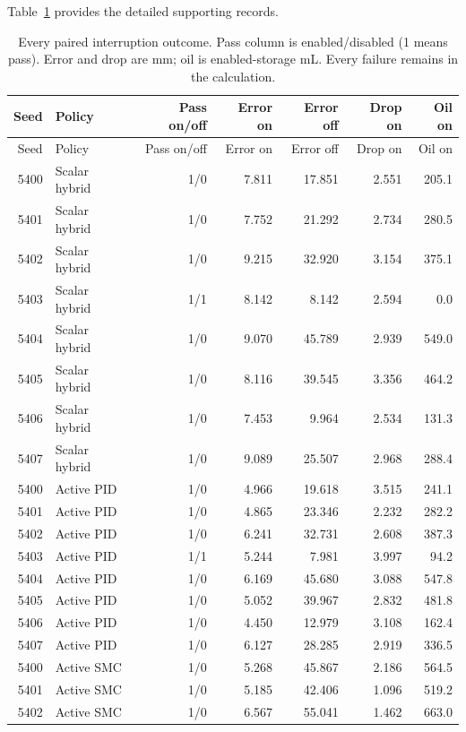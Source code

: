 \documentclass[11pt,a4paper]{article}
\begin{document}
\begingroup\hypersetup{hypertexnames=true}\small\setlength{\tabcolsep}{4pt}
Table~\ref{supp:longtable:5} provides the detailed supporting records.
\begin{longtable}{rlrrrrr}
\caption{Every paired interruption outcome. Pass column is enabled/disabled (1 means pass). Error and drop are mm; oil is enabled-storage mL. Every failure remains in the calculation.}\label{supp:longtable:5}\\\toprule
Seed & Policy & Pass on/off & Error on & Error off & Drop on & Oil on\\\midrule\endfirsthead
\toprule
Seed & Policy & Pass on/off & Error on & Error off & Drop on & Oil on\\\midrule\endhead
5400 & Scalar hybrid & 1/0 & 7.811 & 17.851 & 2.551 & 205.1\\
5401 & Scalar hybrid & 1/0 & 7.752 & 21.292 & 2.734 & 280.5\\
5402 & Scalar hybrid & 1/0 & 9.215 & 32.920 & 3.154 & 375.1\\
5403 & Scalar hybrid & 1/1 & 8.142 & 8.142 & 2.594 & 0.0\\
5404 & Scalar hybrid & 1/0 & 9.070 & 45.789 & 2.939 & 549.0\\
5405 & Scalar hybrid & 1/0 & 8.116 & 39.545 & 3.356 & 464.2\\
5406 & Scalar hybrid & 1/0 & 7.453 & 9.964 & 2.534 & 131.3\\
5407 & Scalar hybrid & 1/0 & 9.089 & 25.507 & 2.968 & 288.4\\
5400 & Active PID & 1/0 & 4.966 & 19.618 & 3.515 & 241.1\\
5401 & Active PID & 1/0 & 4.865 & 23.346 & 2.232 & 282.2\\
5402 & Active PID & 1/0 & 6.241 & 32.731 & 2.608 & 387.3\\
5403 & Active PID & 1/1 & 5.244 & 7.981 & 3.997 & 94.2\\
5404 & Active PID & 1/0 & 6.169 & 45.680 & 3.088 & 547.8\\
5405 & Active PID & 1/0 & 5.052 & 39.967 & 2.832 & 481.8\\
5406 & Active PID & 1/0 & 4.450 & 12.979 & 3.108 & 162.4\\
5407 & Active PID & 1/0 & 6.127 & 28.285 & 2.919 & 336.5\\
5400 & Active SMC & 1/0 & 5.268 & 45.867 & 2.186 & 564.5\\
5401 & Active SMC & 1/0 & 5.185 & 42.406 & 1.096 & 519.2\\
5402 & Active SMC & 1/0 & 6.567 & 55.041 & 1.462 & 663.0\\

\end{longtable}
\end{document}

